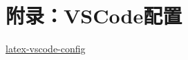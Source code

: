 \appendix
\setcounter{secnumdepth}{0}

\section{附录：VSCode配置}

\href{https://github.com/shinyypig/latex-vscode-config}{latex-vscode-config}
